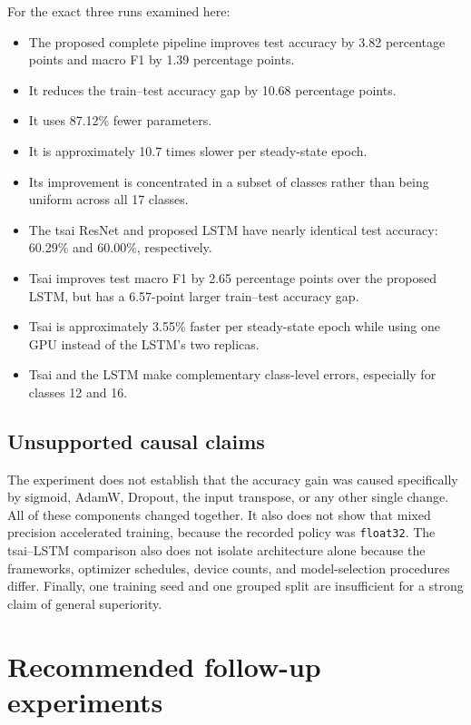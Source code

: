 \documentclass[11pt,a4paper]{article}
\begin{document}
For the exact three runs examined here:

\begin{itemize}
    \item The proposed complete pipeline improves test accuracy by 3.82
          percentage points and macro F1 by 1.39 percentage points.
    \item It reduces the train--test accuracy gap by 10.68 percentage points.
    \item It uses 87.12\% fewer parameters.
    \item It is approximately 10.7 times slower per steady-state epoch.
    \item Its improvement is concentrated in a subset of classes rather than
          being uniform across all 17 classes.
    \item The tsai ResNet and proposed LSTM have nearly identical test
          accuracy: 60.29\% and 60.00\%, respectively.
    \item Tsai improves test macro F1 by 2.65 percentage points over the
          proposed LSTM, but has a 6.57-point larger train--test accuracy gap.
    \item Tsai is approximately 3.55\% faster per steady-state epoch while
          using one GPU instead of the LSTM's two replicas.
    \item Tsai and the LSTM make complementary class-level errors, especially
          for classes 12 and 16.
\end{itemize}

\subsection{Unsupported causal claims}

The experiment does not establish that the accuracy gain was caused
specifically by sigmoid, AdamW, Dropout, the input transpose, or any other
single change. All of these components changed together. It also does not show
that mixed precision accelerated training, because the recorded policy was
\texttt{float32}. The tsai--LSTM comparison also does not isolate architecture
alone because the frameworks, optimizer schedules, device counts, and
model-selection procedures differ. Finally, one training seed and one grouped
split are insufficient for a strong claim of general superiority.

\section{Recommended follow-up experiments}
\end{document}
